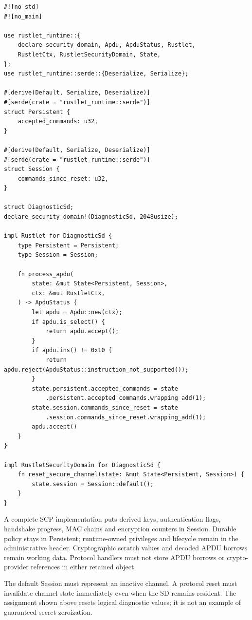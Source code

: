 \begin{verbatim}
#![no_std]
#![no_main]

use rustlet_runtime::{
    declare_security_domain, Apdu, ApduStatus, Rustlet,
    RustletCtx, RustletSecurityDomain, State,
};
use rustlet_runtime::serde::{Deserialize, Serialize};

#[derive(Default, Serialize, Deserialize)]
#[serde(crate = "rustlet_runtime::serde")]
struct Persistent {
    accepted_commands: u32,
}

#[derive(Default, Serialize, Deserialize)]
#[serde(crate = "rustlet_runtime::serde")]
struct Session {
    commands_since_reset: u32,
}

struct DiagnosticSd;
declare_security_domain!(DiagnosticSd, 2048usize);

impl Rustlet for DiagnosticSd {
    type Persistent = Persistent;
    type Session = Session;

    fn process_apdu(
        state: &mut State<Persistent, Session>,
        ctx: &mut RustletCtx,
    ) -> ApduStatus {
        let apdu = Apdu::new(ctx);
        if apdu.is_select() {
            return apdu.accept();
        }
        if apdu.ins() != 0x10 {
            return apdu.reject(ApduStatus::instruction_not_supported());
        }
        state.persistent.accepted_commands = state
            .persistent.accepted_commands.wrapping_add(1);
        state.session.commands_since_reset = state
            .session.commands_since_reset.wrapping_add(1);
        apdu.accept()
    }
}

impl RustletSecurityDomain for DiagnosticSd {
    fn reset_secure_channel(state: &mut State<Persistent, Session>) {
        state.session = Session::default();
    }
}
\end{verbatim}

A complete SCP implementation puts derived keys, authentication flags,
handshake progress, MAC chains and encryption counters in Session. Durable
policy stays in Persistent; runtime-owned privileges and lifecycle remain
in the administrative header. Cryptographic scratch values and decoded APDU
borrows remain working data. Protocol handlers must not store APDU borrows
or crypto-provider references in either retained object.

The default Session must represent an inactive channel. A protocol reset
must invalidate channel state immediately even when the SD remains resident.
The assignment shown above resets logical diagnostic values; it is not an
example of guaranteed secret zeroization.

